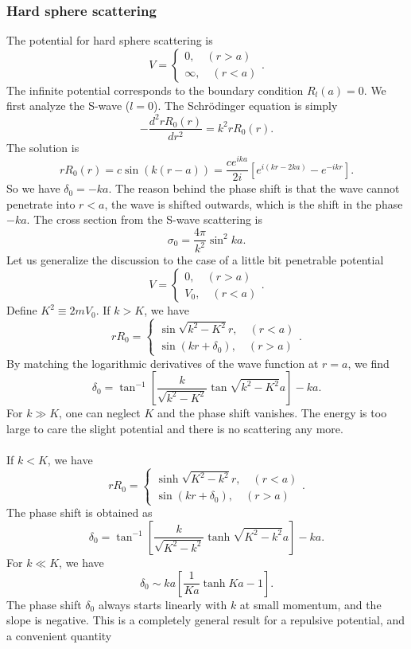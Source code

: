 \subsubsection{Hard sphere scattering}
The potential for hard sphere scattering is
\[V = \begin{cases} 0 , \quad (r > a) \\ \infty , \quad (r < a)\end{cases}.\]
The infinite potential corresponds to the boundary condition $R_l(a) = 0$. We first analyze the S-wave ($l = 0$). The Schr\"{o}dinger equation is simply 
\[-\frac{d^2 rR_0(r)}{dr^2} = k^2 rR_0(r).\]
The solution is
\[rR_0(r) = c\sin(k(r-a)) = \frac{ce^{ika}}{2i} \left[ e^{i(kr-2ka)} - e^{-ikr} \right].\]
So we have $\delta_0 = -ka$. The reason behind the phase shift is that the wave cannot penetrate into $r < a$, the wave is shifted outwards, which is the shift in the phase $-ka$. The cross section from the S-wave scattering is
\[\sigma_0 = \frac{4\pi}{k^2}\sin^2 ka.\]
Let us generalize the discussion to the case of a little bit penetrable potential
\[V = \begin{cases} 0 , \quad (r > a) \\ V_0 , \quad (r < a)\end{cases}.\]
Define $K^2 \equiv 2mV_0$. If $k > K$, we have
\[rR_0 = \begin{cases} \sin \sqrt{k^2-K^2}r , \quad (r < a) \\ \sin(kr+\delta_0) , \quad (r > a)\end{cases}.\]
By matching the logarithmic derivatives of the wave function at $r = a$, we find
\[\delta_0 = \tan^{-1} \left[\frac{k}{\sqrt{k^2-K^2}} \tan\sqrt{k^2-K^2}a \right]-ka.\]
For $k \gg K$, one can neglect $K$ and the phase shift vanishes. The energy is too large to care the slight potential and there is no scattering any more.
\\ \\
If $k < K$, we have
\[rR_0 = \begin{cases} \sinh \sqrt{K^2-k^2}r , \quad (r < a) \\ \sin(kr+\delta_0) , \quad (r > a)\end{cases}.\]
The phase shift is obtained as
\[\delta_0 = \tan^{-1} \left[\frac{k}{\sqrt{K^2-k^2}} \tanh\sqrt{K^2-k^2}a \right]-ka.\]
For $k \ll K$, we have
\[\delta_0 \sim ka \left[ \frac{1}{Ka} \tanh Ka - 1 \right].\]
The phase shift $\delta_0$ always starts linearly with $k$ at small momentum, and the slope is negative. This is a completely general result for a repulsive potential, and a convenient quantity
